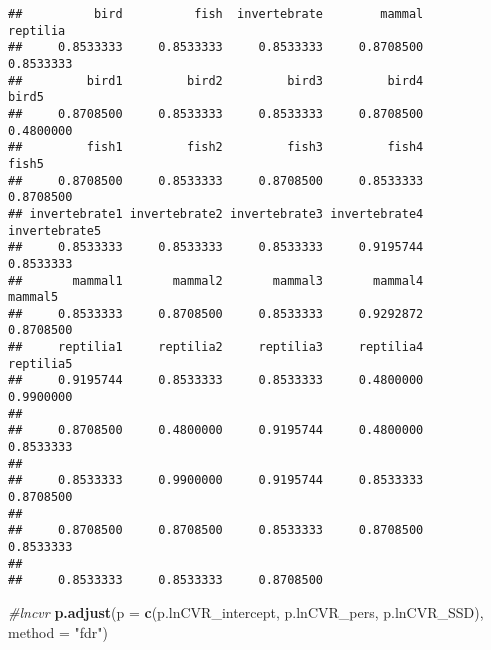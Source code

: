 \documentclass[]{article}
\newenvironment{Shaded}{\begin{snugshade}}{\end{snugshade}}
\newcommand{\KeywordTok}[1]{\textcolor[rgb]{0.13,0.29,0.53}{\textbf{#1}}}
\newcommand{\DataTypeTok}[1]{\textcolor[rgb]{0.13,0.29,0.53}{#1}}
\newcommand{\StringTok}[1]{\textcolor[rgb]{0.31,0.60,0.02}{#1}}
\newcommand{\CommentTok}[1]{\textcolor[rgb]{0.56,0.35,0.01}{\textit{#1}}}
\newcommand{\NormalTok}[1]{#1}
\begin{document}
\begin{verbatim}
##          bird          fish  invertebrate        mammal      reptilia 
##     0.8533333     0.8533333     0.8533333     0.8708500     0.8533333 
##         bird1         bird2         bird3         bird4         bird5 
##     0.8708500     0.8533333     0.8533333     0.8708500     0.4800000 
##         fish1         fish2         fish3         fish4         fish5 
##     0.8708500     0.8533333     0.8708500     0.8533333     0.8708500 
## invertebrate1 invertebrate2 invertebrate3 invertebrate4 invertebrate5 
##     0.8533333     0.8533333     0.8533333     0.9195744     0.8533333 
##       mammal1       mammal2       mammal3       mammal4       mammal5 
##     0.8533333     0.8708500     0.8533333     0.9292872     0.8708500 
##     reptilia1     reptilia2     reptilia3     reptilia4     reptilia5 
##     0.9195744     0.8533333     0.8533333     0.4800000     0.9900000 
##                                                                       
##     0.8708500     0.4800000     0.9195744     0.4800000     0.8533333 
##                                                                       
##     0.8533333     0.9900000     0.9195744     0.8533333     0.8708500 
##                                                                       
##     0.8708500     0.8708500     0.8533333     0.8708500     0.8533333 
##                                           
##     0.8533333     0.8533333     0.8708500
\end{verbatim}

\begin{Shaded}
\begin{Highlighting}[]
    \CommentTok{#lncvr}
  \KeywordTok{p.adjust}\NormalTok{(}\DataTypeTok{p =} \KeywordTok{c}\NormalTok{(p.lnCVR_intercept, p.lnCVR_pers, p.lnCVR_SSD), }\DataTypeTok{method =} \StringTok{"fdr"}\NormalTok{) }
\end{Highlighting}
\end{Shaded}
\end{document}
